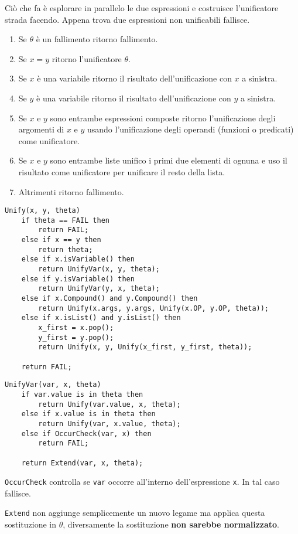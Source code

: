 Ci\`o che fa \`e esplorare in parallelo le due espressioni e costruisce l'unificatore strada facendo. Appena
trova due espressioni non unificabili fallisce.
\begin{enumerate}
	\item Se $\theta$ \`e un fallimento ritorno fallimento.
	\item Se $x = y$ ritorno l'unificatore $\theta$.
	\item Se $x$ \`e una variabile ritorno il risultato dell'unificazione con $x$ a sinistra.
	\item Se $y$ \`e una variabile ritorno il risultato dell'unificazione con $y$ a sinistra.
	\item Se $x$ e $y$ sono entrambe espressioni composte ritorno l'unificazione degli argomenti di $x$ e $y$
	      usando l'unificazione degli operandi (funzioni o predicati) come unificatore.
	\item Se $x$ e $y$ sono entrambe liste unifico i primi due elementi di ognuna e uso il risultato come
	      unificatore per unificare il resto della lista.
	\item Altrimenti ritorno fallimento.
\end{enumerate}

\begin{lstlisting}[style=pseudo-style]
Unify(x, y, theta)
	if theta == FAIL then
		return FAIL;
	else if x == y then
		return theta;
	else if x.isVariable() then
		return UnifyVar(x, y, theta);
	else if y.isVariable() then
		return UnifyVar(y, x, theta);
	else if x.Compound() and y.Compound() then
		return Unify(x.args, y.args, Unify(x.OP, y.OP, theta));
	else if x.isList() and y.isList() then
		x_first = x.pop();
		y_first = y.pop();
		return Unify(x, y, Unify(x_first, y_first, theta));
	
	return FAIL;
\end{lstlisting}

\begin{lstlisting}[style=pseudo-style]
UnifyVar(var, x, theta)
	if var.value is in theta then
		return Unify(var.value, x, theta);
	else if x.value is in theta then
		return Unify(var, x.value, theta);
	else if OccurCheck(var, x) then 
		return FAIL;
	
	return Extend(var, x, theta);
\end{lstlisting}

\verb|OccurCheck| controlla se \verb|var| occorre all'interno dell'espressione \verb|x|. In tal caso fallisce.

\verb|Extend| non aggiunge semplicemente un nuovo legame ma applica questa sostituzione in $\theta$,
diversamente la sostituzione \textbf{non sarebbe normalizzato}.

